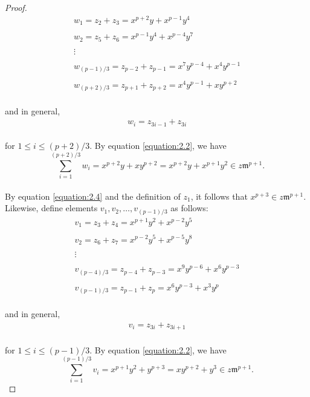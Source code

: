 \documentclass{amsart}
\theoremstyle{definition}
\theoremstyle{definition}
\numberwithin{equation}{section}
\theoremstyle{definition}
\begin{document}
{\begin{proof}
\begin{align*}
&w_1 = z_2 + z_3 = x^{p+2}y + x^{p-1}y^4&\\\\
&w_2 = z_5 +z _6 = x^{p-1}y^4 + x^{p-4}y^{7}&\\\\ 
&\vdots& \\\\
&w_{(p-1)/3}=z_{p-2} + z_{p-1} = x^7 y^{p-4} + x^4 y^{p-1}&
\\\\
&w_{(p+2)/3}= z_{p+1} + z_{p+2} = x^4 y^{p-1} + x y^{p+2}&
\end{align*} \text{}\\ and in general, 
\begin{align*}
&w_i = z_{3i-1} + z_{3i}& 
\end{align*}
\text{}\\ for $1 \leq i \leq (p+2)/3.$
By equation \ref{equation:2.2}, we have \\
\begin{equation}\label{equation:2.4}
\sum\limits_{i=1}^{(p+2)/3} w_{i} = x^{p+2}y + xy^{p+2} = x^{p+2}y + x^{p+1}y^2 \in z \mathfrak{m}^{p+1}.
\end{equation} \text{}\\ By equation \ref{equation:2.4} and the definition of $z_1$, it follows that $x^{p+3} \in z \mathfrak{m}^{p+1}$. Likewise, define elements $v_1, v_2, \dots, v_{(p-1)/3}$ as follows: \\
\begin{align*}
&v_1 = z_3 + z_4 = x^{p+1}y^2 + x^{p-2}y^5&\\\\
&v_2 = z_6 +z _7 = x^{p-2}y^5 + x^{p-5}y^{8}&\\\\ 
&\vdots& \\\\
&v_{(p-4)/3}=z_{p-4} + z_{p-3} = x^9 y^{p-6} + x^6 y^{p-3}&
\\\\
&v_{(p-1)/3}= z_{p-1} + z_{p} = x^6 y^{p-3} + x^3y^{p}&
\end{align*} \text{}\\ and in general, 
\begin{align*}
&v_i = z_{3i} + z_{3i+1}&
\end{align*}\text{}\\
for $1 \leq i \leq (p-1)/3$. By equation \ref{equation:2.2}, we have \\
\begin{equation}\label{equation:2.3}
\sum\limits_{i=1}^{(p-1)/3} v_{i} = x^{p+1}y^2 + y^{p+3} = xy^{p+2} + y^3 \in z \mathfrak{m}^{p+1}.

\end{equation}
\end{proof}}
\end{document}

